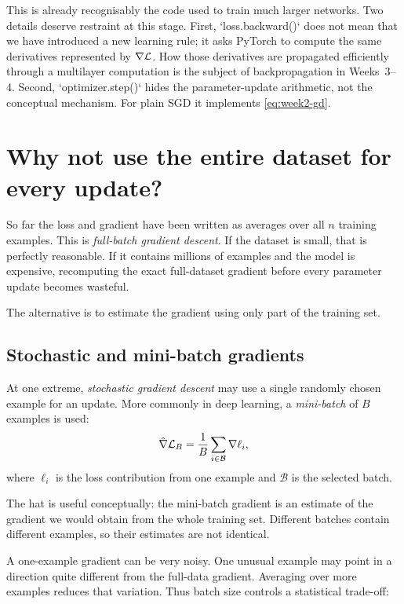 This is already recognisably the code used to train much larger networks. Two details deserve restraint at this stage. First, `loss.backward()` does not mean that we have introduced a new learning rule; it asks PyTorch to compute the same derivatives represented by \(\nabla\mathcal{L}\). How those derivatives are propagated efficiently through a multilayer computation is the subject of backpropagation in Weeks~3--4. Second, `optimizer.step()` hides the parameter-update arithmetic, not the conceptual mechanism. For plain SGD it implements \cref{eq:week2-gd}.

\section{Why not use the entire dataset for every update?}

So far the loss and gradient have been written as averages over all \(n\) training examples. This is \emph{full-batch gradient descent}. If the dataset is small, that is perfectly reasonable. If it contains millions of examples and the model is expensive, recomputing the exact full-dataset gradient before every parameter update becomes wasteful.

The alternative is to estimate the gradient using only part of the training set.

\subsection{Stochastic and mini-batch gradients}

At one extreme, \emph{stochastic gradient descent} may use a single randomly chosen example for an update. More commonly in deep learning, a \emph{mini-batch} of \(B\) examples is used:
\begin{equation}
  \hat{\nabla}\mathcal{L}_B
  = \frac{1}{B}\sum_{i\in\mathcal{B}} \nabla \ell_i,
  \label{eq:week2-minibatch-gradient}
\end{equation}
where \(\ell_i\) is the loss contribution from one example and \(\mathcal{B}\) is the selected batch.

The hat is useful conceptually: the mini-batch gradient is an estimate of the gradient we would obtain from the whole training set. Different batches contain different examples, so their estimates are not identical.

A one-example gradient can be very noisy. One unusual example may point in a direction quite different from the full-data gradient. Averaging over more examples reduces that variation. Thus batch size controls a statistical trade-off:


